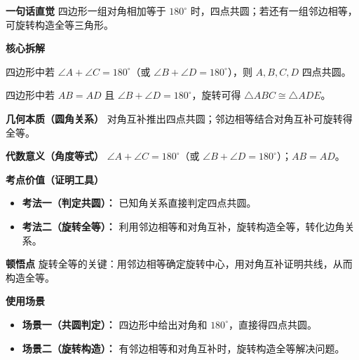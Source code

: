 \begin{explanationbox}
	\textbf{\textcolor{CExplanation}{一句话直觉}}
	四边形一组对角相加等于 $180^\circ$ 时，四点共圆；若还有一组邻边相等，可旋转构造全等三角形。

	\medskip
	\textbf{\textcolor{CExplanation}{核心拆解}}
	\begin{description}[style=nextline, leftmargin=2.8em, labelsep=0.5em, itemsep=0.45em]
		\item[\textbf{要点一（对角互补判圆）：}]
			四边形中若 $\angle A+\angle C=180^\circ$（或 $\angle B+\angle D=180^\circ$），则 $A,B,C,D$ 四点共圆。
		\item[\textbf{要点二（旋转构造全等）：}]
			四边形中若 $AB=AD$ 且 $\angle B+\angle D=180^\circ$，旋转可得 $\triangle ABC\cong\triangle ADE$。
	\end{description}

	\medskip
	\textbf{\textcolor{CExplanation}{几何本质（圆角关系）}}
	对角互补推出四点共圆；邻边相等结合对角互补可旋转得全等。

	\medskip
	\textbf{\textcolor{CExplanation}{代数意义（角度等式）}}
	$\angle A+\angle C=180^\circ$（或 $\angle B+\angle D=180^\circ$）；$AB=AD$。

	\medskip
	\textbf{\textcolor{CExplanation}{考点价值（证明工具）}}
	\begin{itemize}[leftmargin=*, itemsep=0.5em, topsep=0.4em]
		\item \textbf{考法一（判定共圆）：} 已知角关系直接判定四点共圆。
		\item \textbf{考法二（旋转全等）：} 利用邻边相等和对角互补，旋转构造全等，转化边角关系。
	\end{itemize}

	\medskip
	\textbf{\textcolor{CExplanation}{顿悟点}}
	旋转全等的关键：用邻边相等确定旋转中心，用对角互补证明共线，从而构造全等。

	\medskip
	\textbf{\textcolor{CExplanation}{使用场景}}
	\begin{itemize}[leftmargin=*, itemsep=0.5em, topsep=0.4em]
		\item \textbf{场景一（共圆判定）：} 四边形中给出对角和 $180^\circ$，直接得四点共圆。
		\item \textbf{场景二（旋转构造）：} 有邻边相等和对角互补时，旋转构造全等解决问题。
	\end{itemize}

\end{explanationbox}
